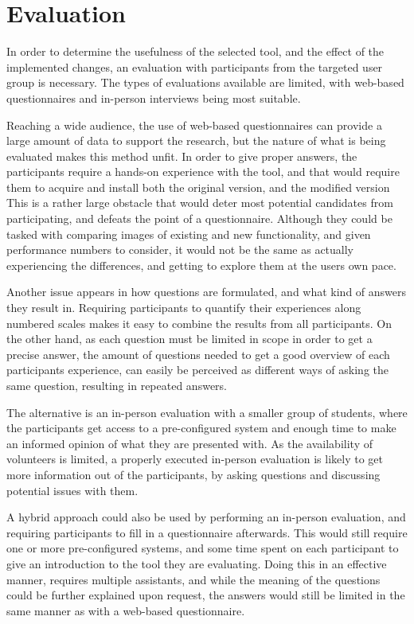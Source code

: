 \section{Evaluation}\label{methEval}

In order to determine the usefulness of the selected tool, and the effect of the implemented changes, an evaluation with participants from the targeted user group is necessary.
The types of evaluations available are limited, with web-based questionnaires and in-person interviews being most suitable.

Reaching a wide audience, the use of web-based questionnaires can provide a large amount of data to support the research, but the nature of what is being evaluated makes this method unfit.
In order to give proper answers, the participants require a hands-on experience with the tool, and that would require them to acquire and install both the original version, and the modified version
This is a rather large obstacle that would deter most potential candidates from participating, and defeats the point of a questionnaire.
Although they could be tasked with comparing images of existing and new functionality, and given performance numbers to consider, it would not be the same as actually experiencing the differences, and getting to explore them at the users own pace.

Another issue appears in how questions are formulated, and what kind of answers they result in.
Requiring participants to quantify their experiences along numbered scales makes it easy to combine the results from all participants.
On the other hand, as each question must be limited in scope in order to get a precise answer, the amount of questions needed to get a good overview of each participants experience, can easily be perceived as different ways of asking the same question, resulting in repeated answers.

The alternative is an in-person evaluation with a smaller group of students, where the participants get access to a pre-configured system and enough time to make an informed opinion of what they are presented with.
As the availability of volunteers is limited, a properly executed in-person evaluation is likely to get more information out of the participants, by asking questions and discussing potential issues with them.

A hybrid approach could also be used by performing an in-person evaluation, and requiring participants to fill in a questionnaire afterwards.
This would still require one or more pre-configured systems, and some time spent on each participant to give an introduction to the tool they are evaluating.
Doing this in an effective manner, requires multiple assistants, and while the meaning of the questions could be further explained upon request, the answers would still be limited in the same manner as with a web-based questionnaire.


